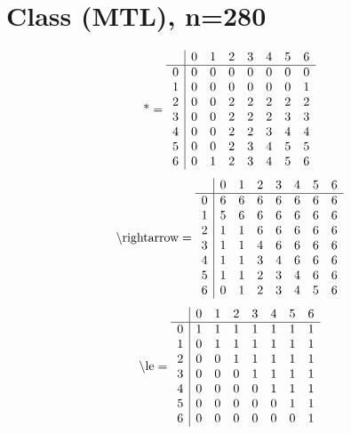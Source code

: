\documentclass[11pt]{article}
\begin{document}
\section{Class (MTL), n=280}
\[\text{*} = 
\begin{array}{r | r r r r r r r}
 & 0 & 1 & 2 & 3 & 4 & 5 & 6 \\ \hline
0 & 0 & 0 & 0 & 0 & 0 & 0 & 0 \\
1 & 0 & 0 & 0 & 0 & 0 & 0 & 1 \\
2 & 0 & 0 & 2 & 2 & 2 & 2 & 2 \\
3 & 0 & 0 & 2 & 2 & 2 & 3 & 3 \\
4 & 0 & 0 & 2 & 2 & 3 & 4 & 4 \\
5 & 0 & 0 & 2 & 3 & 4 & 5 & 5 \\
6 & 0 & 1 & 2 & 3 & 4 & 5 & 6 \\
\end{array}
\]
\[\text{\textbackslash rightarrow} = 
\begin{array}{r | r r r r r r r}
 & 0 & 1 & 2 & 3 & 4 & 5 & 6 \\ \hline
0 & 6 & 6 & 6 & 6 & 6 & 6 & 6 \\
1 & 5 & 6 & 6 & 6 & 6 & 6 & 6 \\
2 & 1 & 1 & 6 & 6 & 6 & 6 & 6 \\
3 & 1 & 1 & 4 & 6 & 6 & 6 & 6 \\
4 & 1 & 1 & 3 & 4 & 6 & 6 & 6 \\
5 & 1 & 1 & 2 & 3 & 4 & 6 & 6 \\
6 & 0 & 1 & 2 & 3 & 4 & 5 & 6 \\
\end{array}
\]
\[\text{\textbackslash le} = 
\begin{array}{r | r r r r r r r}
 & 0 & 1 & 2 & 3 & 4 & 5 & 6 \\ \hline
0 & 1 & 1 & 1 & 1 & 1 & 1 & 1 \\
1 & 0 & 1 & 1 & 1 & 1 & 1 & 1 \\
2 & 0 & 0 & 1 & 1 & 1 & 1 & 1 \\
3 & 0 & 0 & 0 & 1 & 1 & 1 & 1 \\
4 & 0 & 0 & 0 & 0 & 1 & 1 & 1 \\
5 & 0 & 0 & 0 & 0 & 0 & 1 & 1 \\
6 & 0 & 0 & 0 & 0 & 0 & 0 & 1 \\
\end{array}
\]
\end{document}

